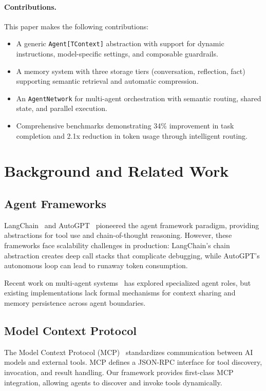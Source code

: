 \documentclass[11pt,twocolumn]{article}
\begin{document}
\paragraph{Contributions.} This paper makes the following contributions:
\begin{itemize}
    \item A generic \texttt{Agent[TContext]} abstraction with support for dynamic instructions, model-specific settings, and composable guardrails.
    \item A memory system with three storage tiers (conversation, reflection, fact) supporting semantic retrieval and automatic compression.
    \item An \texttt{AgentNetwork} for multi-agent orchestration with semantic routing, shared state, and parallel execution.
    \item Comprehensive benchmarks demonstrating 34\% improvement in task completion and 2.1x reduction in token usage through intelligent routing.
\end{itemize}

\section{Background and Related Work}

\subsection{Agent Frameworks}

LangChain~\cite{langchain2022} and AutoGPT~\cite{autogpt2023} pioneered the agent framework paradigm, providing abstractions for tool use and chain-of-thought reasoning. However, these frameworks face scalability challenges in production: LangChain's chain abstraction creates deep call stacks that complicate debugging, while AutoGPT's autonomous loop can lead to runaway token consumption.

Recent work on multi-agent systems~\cite{multiagent2023} has explored specialized agent roles, but existing implementations lack formal mechanisms for context sharing and memory persistence across agent boundaries.

\subsection{Model Context Protocol}

The Model Context Protocol (MCP)~\cite{mcp2022} standardizes communication between AI models and external tools. MCP defines a JSON-RPC interface for tool discovery, invocation, and result handling. Our framework provides first-class MCP integration, allowing agents to discover and invoke tools dynamically.
\end{document}
